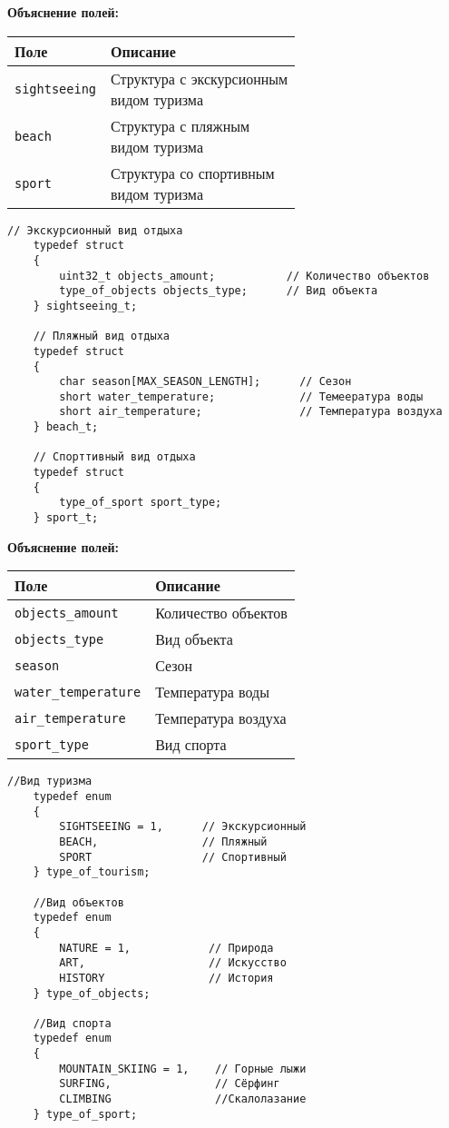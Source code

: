 \noindent\textbf{Объяснение полей:}
\newline
\begin{tabular}{|l|l|}
	\hline
	\textbf{Поле} & \textbf{Описание} \\
	\hline
	\texttt{sightseeing} & \makecell{Структура с экскурсионным\\видом туризма} \\
	\hline
	\texttt{beach} & \makecell{Структура с пляжным\\видом туризма} \\
	\hline
	\texttt{sport} & \makecell{Структура со спортивным\\видом туризма} \\
	\hline
\end{tabular}
\vspace{2em}

\begin{lstlisting}[caption={Структуры туризма}, label={lst:listing3}]
	// Экскурсионный вид отдыха
	typedef struct
	{
		uint32_t objects_amount;           // Количество объектов
		type_of_objects objects_type;      // Вид объекта
	} sightseeing_t;   
	
	// Пляжный вид отдыха
	typedef struct
	{
		char season[MAX_SEASON_LENGTH];      // Сезон
		short water_temperature;             // Темеература воды
		short air_temperature;               // Температура воздуха
	} beach_t;
	
	// Спорттивный вид отдыха
	typedef struct
	{
		type_of_sport sport_type;
	} sport_t;
\end{lstlisting}

\noindent\textbf{Объяснение полей:}
\newline
\begin{tabular}{|l|l|}
	\hline
	\textbf{Поле} & \textbf{Описание} \\
	\hline
	\texttt{objects\_amount} & Количество объектов \\
	\hline
	\texttt{objects\_type} & Вид объекта \\
	\hline
	\texttt{season} & Сезон \\
	\hline
	\texttt{water\_temperature} & Температура воды \\
	\hline
	\texttt{air\_temperature} & Температура воздуха \\
	\hline
	\texttt{sport\_type} & Вид спорта \\
	\hline
\end{tabular}
\vspace{2em}
\begin{lstlisting}[caption={Возможные поля туризма}, label={lst:listing4}]
	//Вид туризма
	typedef enum 
	{
		SIGHTSEEING = 1,      // Экскурсионный
		BEACH,                // Пляжный
		SPORT                 // Спортивный 
	} type_of_tourism;
	
	//Вид объектов
	typedef enum 
	{
		NATURE = 1,            // Природа
		ART,                   // Искусство
		HISTORY                // История 
	} type_of_objects;
	
	//Вид спорта
	typedef enum 
	{
		MOUNTAIN_SKIING = 1,    // Горные лыжи
		SURFING,                // Сёрфинг
		CLIMBING                //Скалолазание
	} type_of_sport;
\end{lstlisting}